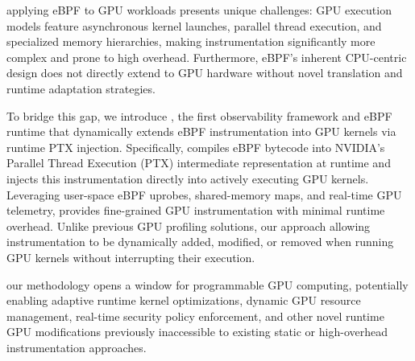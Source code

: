  applying eBPF to GPU workloads presents unique challenges: GPU execution models feature asynchronous kernel launches, parallel thread execution, and specialized memory hierarchies, making instrumentation significantly more complex and prone to high overhead. Furthermore, eBPF’s inherent CPU-centric design does not directly extend to GPU hardware without novel translation and runtime adaptation strategies.

To bridge this gap, we introduce \sys, the first observability framework and eBPF runtime that dynamically extends eBPF instrumentation into GPU kernels via runtime PTX injection. 
Specifically, \sys{} compiles eBPF bytecode into NVIDIA's Parallel Thread Execution (PTX) intermediate representation at runtime and injects this instrumentation directly into actively executing GPU kernels. 
Leveraging user-space eBPF uprobes, shared-memory maps, and real-time GPU telemetry, \sys{} provides fine-grained GPU instrumentation with minimal runtime overhead. 
Unlike previous GPU profiling solutions, our approach  allowing instrumentation to be dynamically added, modified, or removed when running GPU kernels without interrupting their execution. 


 our methodology opens a window for programmable GPU computing, potentially enabling adaptive runtime kernel optimizations, dynamic GPU resource management, real-time security policy enforcement, and other novel runtime GPU modifications previously inaccessible to existing static or high-overhead instrumentation approaches.%

